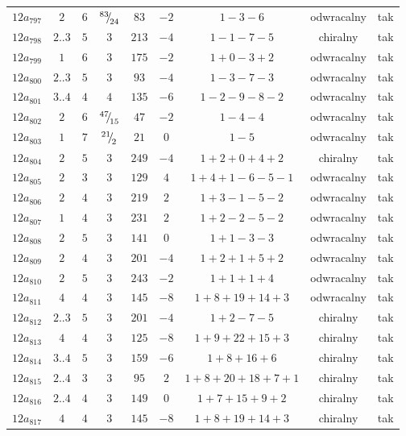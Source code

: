 \begin{longtable}{ccccccccc}
$12a_{797}$ & $2$ & $6$ & ${}^{83}{\mskip -5mu/\mskip -3mu}_{24}$ & $83$ & $-2$ & $1-3-6$ & odwracalny & tak \\
$12a_{798}$ & $2..3$ & $5$ & $3$ & $213$ & $-4$ & $1-1-7-5$ & chiralny & tak \\
$12a_{799}$ & $1$ & $6$ & $3$ & $175$ & $-2$ & $1+0-3+2$ & odwracalny & tak \\
$12a_{800}$ & $2..3$ & $5$ & $3$ & $93$ & $-4$ & $1-3-7-3$ & odwracalny & tak \\
$12a_{801}$ & $3..4$ & $4$ & $4$ & $135$ & $-6$ & $1-2-9-8-2$ & odwracalny & tak \\
$12a_{802}$ & $2$ & $6$ & ${}^{47}{\mskip -5mu/\mskip -3mu}_{15}$ & $47$ & $-2$ & $1-4-4$ & odwracalny & tak \\
$12a_{803}$ & $1$ & $7$ & ${}^{21}{\mskip -5mu/\mskip -3mu}_{2}$ & $21$ & $0$ & $1-5$ & odwracalny & tak \\
$12a_{804}$ & $2$ & $5$ & $3$ & $249$ & $-4$ & $1+2+0+4+2$ & chiralny & tak \\
$12a_{805}$ & $2$ & $3$ & $3$ & $129$ & $4$ & $1+4+1-6-5-1$ & odwracalny & tak \\
$12a_{806}$ & $2$ & $4$ & $3$ & $219$ & $2$ & $1+3-1-5-2$ & odwracalny & tak \\
$12a_{807}$ & $1$ & $4$ & $3$ & $231$ & $2$ & $1+2-2-5-2$ & odwracalny & tak \\
$12a_{808}$ & $2$ & $5$ & $3$ & $141$ & $0$ & $1+1-3-3$ & odwracalny & tak \\
$12a_{809}$ & $2$ & $4$ & $3$ & $201$ & $-4$ & $1+2+1+5+2$ & odwracalny & tak \\
$12a_{810}$ & $2$ & $5$ & $3$ & $243$ & $-2$ & $1+1+1+4$ & odwracalny & tak \\
$12a_{811}$ & $4$ & $4$ & $3$ & $145$ & $-8$ & $1+8+19+14+3$ & odwracalny & tak \\
$12a_{812}$ & $2..3$ & $5$ & $3$ & $201$ & $-4$ & $1+2-7-5$ & chiralny & tak \\
$12a_{813}$ & $4$ & $4$ & $3$ & $125$ & $-8$ & $1+9+22+15+3$ & chiralny & tak \\
$12a_{814}$ & $3..4$ & $5$ & $3$ & $159$ & $-6$ & $1+8+16+6$ & chiralny & tak \\
$12a_{815}$ & $2..4$ & $3$ & $3$ & $95$ & $2$ & $1+8+20+18+7+1$ & chiralny & tak \\
$12a_{816}$ & $2..4$ & $4$ & $3$ & $149$ & $0$ & $1+7+15+9+2$ & chiralny & tak \\
$12a_{817}$ & $4$ & $4$ & $3$ & $145$ & $-8$ & $1+8+19+14+3$ & chiralny & tak \\

\end{longtable}
